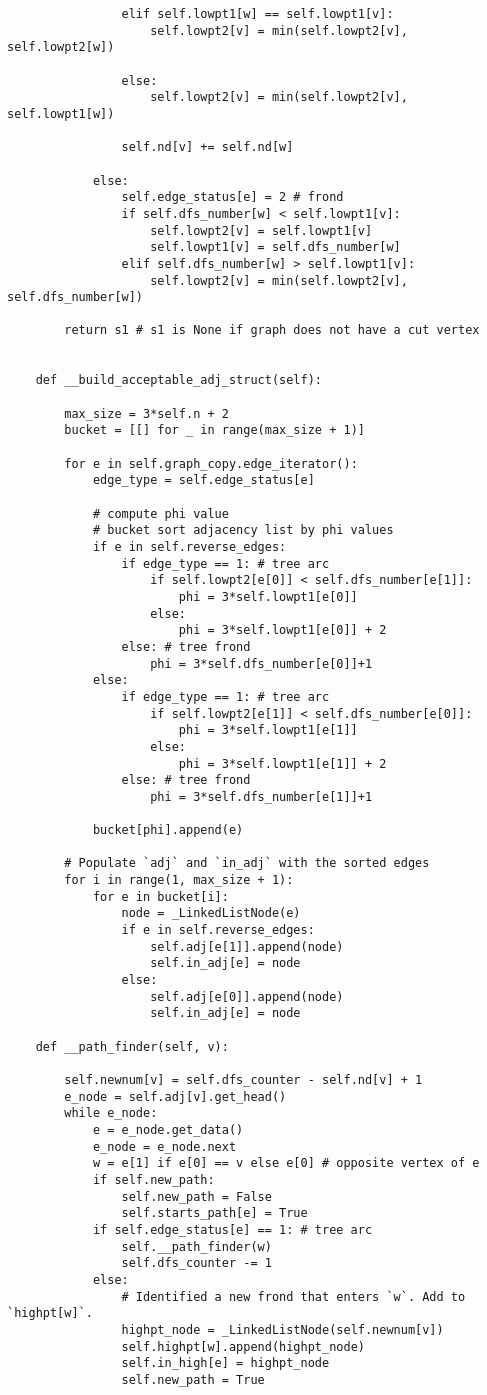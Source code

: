 \begin{center}
\begin{verbatim}
				elif self.lowpt1[w] == self.lowpt1[v]:
					self.lowpt2[v] = min(self.lowpt2[v], self.lowpt2[w])

				else:
					self.lowpt2[v] = min(self.lowpt2[v], self.lowpt1[w])

				self.nd[v] += self.nd[w]

			else:
				self.edge_status[e] = 2 # frond
				if self.dfs_number[w] < self.lowpt1[v]:
					self.lowpt2[v] = self.lowpt1[v]
					self.lowpt1[v] = self.dfs_number[w]
				elif self.dfs_number[w] > self.lowpt1[v]:
					self.lowpt2[v] = min(self.lowpt2[v], self.dfs_number[w])

		return s1 # s1 is None if graph does not have a cut vertex


	def __build_acceptable_adj_struct(self):

		max_size = 3*self.n + 2
		bucket = [[] for _ in range(max_size + 1)]

		for e in self.graph_copy.edge_iterator():
			edge_type = self.edge_status[e]

			# compute phi value
			# bucket sort adjacency list by phi values
			if e in self.reverse_edges:
				if edge_type == 1: # tree arc
					if self.lowpt2[e[0]] < self.dfs_number[e[1]]:
						phi = 3*self.lowpt1[e[0]]
					else:
						phi = 3*self.lowpt1[e[0]] + 2
				else: # tree frond
					phi = 3*self.dfs_number[e[0]]+1
			else:
				if edge_type == 1: # tree arc
					if self.lowpt2[e[1]] < self.dfs_number[e[0]]:
						phi = 3*self.lowpt1[e[1]]
					else:
						phi = 3*self.lowpt1[e[1]] + 2
				else: # tree frond
					phi = 3*self.dfs_number[e[1]]+1

			bucket[phi].append(e)

		# Populate `adj` and `in_adj` with the sorted edges
		for i in range(1, max_size + 1):
			for e in bucket[i]:
				node = _LinkedListNode(e)
				if e in self.reverse_edges:
					self.adj[e[1]].append(node)
					self.in_adj[e] = node
				else:
					self.adj[e[0]].append(node)
					self.in_adj[e] = node

	def __path_finder(self, v):

		self.newnum[v] = self.dfs_counter - self.nd[v] + 1
		e_node = self.adj[v].get_head()
		while e_node:
			e = e_node.get_data()
			e_node = e_node.next
			w = e[1] if e[0] == v else e[0] # opposite vertex of e
			if self.new_path:
				self.new_path = False
				self.starts_path[e] = True
			if self.edge_status[e] == 1: # tree arc
				self.__path_finder(w)
				self.dfs_counter -= 1
			else:
				# Identified a new frond that enters `w`. Add to `highpt[w]`.
				highpt_node = _LinkedListNode(self.newnum[v])
				self.highpt[w].append(highpt_node)
				self.in_high[e] = highpt_node
				self.new_path = True



\end{verbatim}
\end{center}

